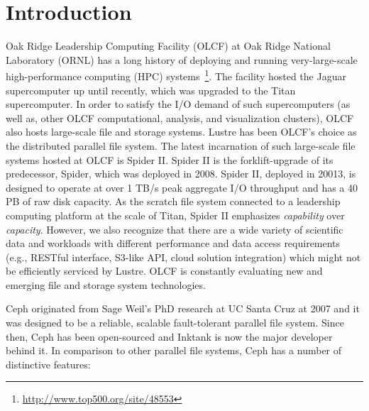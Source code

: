 \section{Introduction}

Oak Ridge Leadership Computing Facility (OLCF) at Oak Ridge National Laboratory
(ORNL) has a long history of deploying and running very-large-scale
high-performance computing (HPC)
systems~\footnote{\url{http://www.top500.org/site/48553}}. The facility hosted
the Jaguar supercomputer up until recently, which was upgraded to the Titan
supercomputer. In order to satisfy the I/O demand of such supercomputers (as
well as, other OLCF computational, analysis, and visualization clusters), OLCF
also hosts large-scale file and storage systems. Lustre has been OLCF's choice
as the distributed parallel file system.  The latest incarnation of such
large-scale file systems hosted at OLCF is Spider II\cite{spider2}. Spider II
is the forklift-upgrade of its predecessor, Spider, which was deployed in 2008.
Spider II, deployed in 20013, is designed to operate at over 1 TB/s peak
aggregate I/O throughput and has a 40 PB of raw disk capacity. As the scratch
file system connected to a leadership computing platform at the scale of Titan,
Spider II emphasizes \textit{capability} over \textit{capacity}. However, we
also recognize that there are a wide variety of scientific data and workloads
with different performance and data access requirements (e.g., RESTful
interface, S3-like API, cloud solution integration) which might not be
efficiently serviced by Lustre. OLCF is constantly evaluating new and emerging
file and storage system technologies.  

Ceph\cite{Weil:2006:Ceph} originated from Sage Weil's PhD research at UC Santa
Cruz at 2007 and it was designed to be a reliable, scalable fault-tolerant
parallel file system.  Since then, Ceph has been open-sourced and Inktank is
now the major developer behind it.  In comparison to other parallel file
systems, Ceph has a number of distinctive features:

